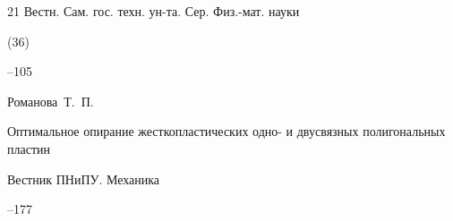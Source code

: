 \begin{thebibliography}{21}
\jour  Вестн. Сам. гос. техн. ун-та. Сер. Физ.-мат. науки


(36)

--105






%













\by Романова~Т.~П.

\paper Оптимальное опирание жесткопластических одно- и двусвязных полигональных пластин

\jour Вестник ПНиПУ.  Механика



--177









%



\end{thebibliography}
